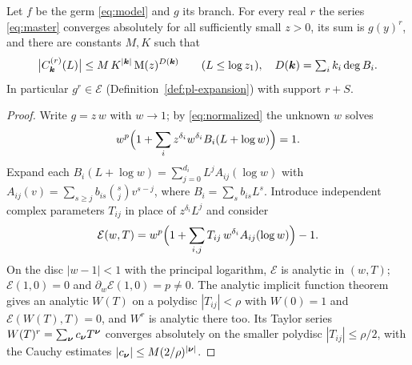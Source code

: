 \begin{theorem}[Convergence]
\label{thm:convergence}
Let $f$ be the germ \eqref{eq:model} and $g$ its branch. For every real $r$ the series \eqref{eq:master} converges absolutely for all sufficiently small $z>0$, its sum is $g(y)^r$, and there are constants $M,K$ such that
\begin{equation}
 \bigl|C^{(r)}_{\boldsymbol k}(L)\bigr|\le M\,K^{|\boldsymbol k|}\,\mathrm M(z)^{D(\boldsymbol k)}\qquad(L\le\log z_1),\quad D(\boldsymbol k)=\textstyle\sum_ik_i\deg B_i .
 \label{eq:coefficient-bound}
\end{equation}
In particular $g^r\in\mathcal E$ (Definition~\ref{def:pl-expansion}) with support $r+S$.
\end{theorem}
\begin{proof}
Write $g=z\,w$ with $w\to1$; by \eqref{eq:normalized} the unknown $w$ solves
\[
 w^p\Bigl(1+\sum_iz^{\delta_i}w^{\delta_i}B_i(L+\log w)\Bigr)=1 .
\]
Expand each $B_i(L+\log w)=\sum_{j=0}^{d_i}L^jA_{ij}(\log w)$ with $A_{ij}(v)=\sum_{s\ge j}b_{is}\binom sjv^{s-j}$, where $B_i=\sum_sb_{is}L^s$. Introduce independent complex parameters $T_{ij}$ in place of $z^{\delta_i}L^j$ and consider
\begin{equation}
 \mathcal E(w,T)=w^p\Bigl(1+\sum_{i,j}T_{ij}\,w^{\delta_i}A_{ij}(\log w)\Bigr)-1 .
 \label{eq:parametric}
\end{equation}
On the disc $|w-1|<1$ with the principal logarithm, $\mathcal E$ is analytic in $(w,T)$; $\mathcal E(1,0)=0$ and $\partial_w\mathcal E(1,0)=p\ne0$. The analytic implicit function theorem gives an analytic $W(T)$ on a polydisc $|T_{ij}|<\rho$ with $W(0)=1$ and $\mathcal E(W(T),T)=0$, and $W^r$ is analytic there too. Its Taylor series $W(T)^r=\sum_{\boldsymbol\nu}c_{\boldsymbol\nu}T^{\boldsymbol\nu}$ converges absolutely on the smaller polydisc $|T_{ij}|\le\rho/2$, with the Cauchy estimates $|c_{\boldsymbol\nu}|\le M(2/\rho)^{|\boldsymbol\nu|}$.


\end{proof}
